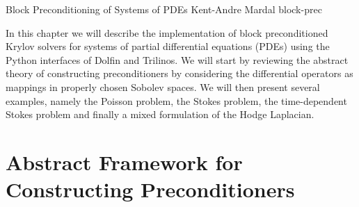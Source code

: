 

              {Block Preconditioning of Systems of PDEs}
              {Kent-Andre Mardal}
              {block-prec}

In this chapter we will describe the implementation of block preconditioned
Krylov solvers for systems of partial differential equations (PDEs) using
the Python interfaces of Dolfin and Trilinos. 
We will start by reviewing the
abstract theory of constructing preconditioners by considering the
differential operators as mappings in properly chosen Sobolev spaces. 
We will then
present several examples, namely the Poisson problem, the Stokes problem, 
the time-dependent Stokes problem and finally a mixed formulation
of the Hodge Laplacian. 

\section{Abstract Framework for Constructing Preconditioners}

